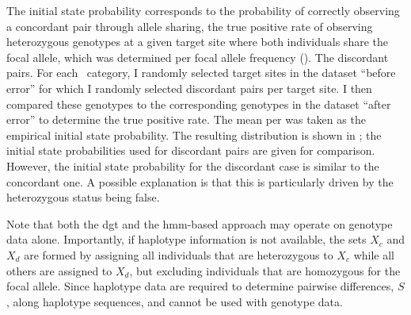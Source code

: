 The initial state probability corresponds to the probability of correctly observing a concordant pair through allele sharing, \ie the true positive rate of observing heterozygous genotypes at a given target site where both individuals share the focal allele, which was determined per focal allele frequency (\fk{}).
The  discordant pairs.
For each \fk{}~category, I randomly selected  target sites in the dataset ``before error'' for which I randomly selected  discordant pairs per target site.
I then compared these genotypes to the corresponding genotypes in the dataset ``after error'' to determine the true positive rate.
The mean per \fk{} was taken as the empirical initial state probability.
The resulting distribution is shown in ; the initial state probabilities used for discordant pairs are given for comparison.
However, the initial state probability for the discordant case is similar to the concordant one.
A possible explanation is that this is particularly driven by the heterozygous status being false.



Note that both the \gls{dgt} and the \gls{hmm}-based approach may operate on genotype data alone.
Importantly, if haplotype information is not available, the sets $X_c$ and $X_d$ are formed by assigning all individuals that are heterozygous to $X_c$ while all others are assigned to $X_d$, but excluding individuals that are homozygous for the focal allele.
Since haplotype data are required to determine pairwise differences, $S$, along haplotype sequences, \ClockM and \ClockC cannot be used with genotype data.





